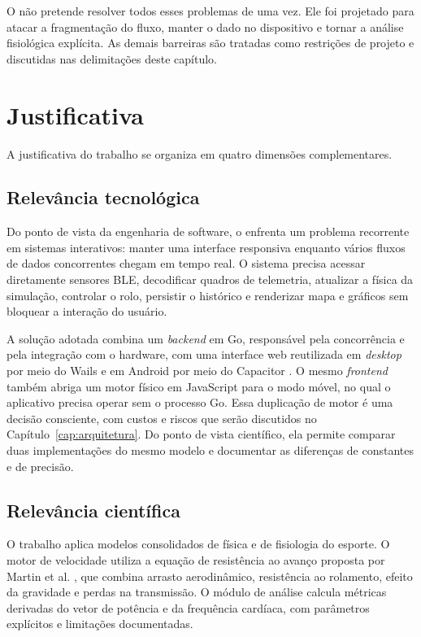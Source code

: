 O \argus{} não pretende resolver todos esses problemas de uma vez. Ele foi
projetado para atacar a fragmentação do fluxo, manter o dado no dispositivo e
tornar a análise fisiológica explícita. As demais barreiras são tratadas como
restrições de projeto e discutidas nas delimitações deste capítulo.

\section{Justificativa}
\label{sec:justificativa}

A justificativa do trabalho se organiza em quatro dimensões complementares.

\subsection{Relevância tecnológica}
\label{sec:relevancia-tecnologica}

Do ponto de vista da engenharia de software, o \argus{} enfrenta um problema
recorrente em sistemas interativos: manter uma interface responsiva enquanto
vários fluxos de dados concorrentes chegam em tempo real. O sistema precisa
acessar diretamente sensores BLE, decodificar quadros de telemetria, atualizar
a física da simulação, controlar o rolo, persistir o histórico e renderizar
mapa e gráficos sem bloquear a interação do usuário.

A solução adotada combina um \textit{backend} em Go, responsável pela
concorrência e pela integração com o hardware, com uma interface web reutilizada
em \textit{desktop} por meio do Wails \cite{wails2024} e em Android por meio do
Capacitor \cite{capacitor2024}. O mesmo \textit{frontend} também abriga um motor
físico em JavaScript para o modo móvel, no qual o aplicativo precisa operar sem
o processo Go. Essa duplicação de motor é uma decisão consciente, com custos e
riscos que serão discutidos no Capítulo~\ref{cap:arquitetura}. Do ponto de vista
científico, ela permite comparar duas implementações do mesmo modelo e
documentar as diferenças de constantes e de precisão.

\subsection{Relevância científica}
\label{sec:relevancia-cientifica}

O trabalho aplica modelos consolidados de física e de fisiologia do esporte. O
motor de velocidade utiliza a equação de resistência ao avanço proposta por
Martin et al. \cite{martin1998}, que combina arrasto aerodinâmico, resistência
ao rolamento, efeito da gravidade e perdas na transmissão. O módulo de análise
calcula métricas derivadas do vetor de potência e da frequência cardíaca, com
parâmetros explícitos e limitações documentadas.

